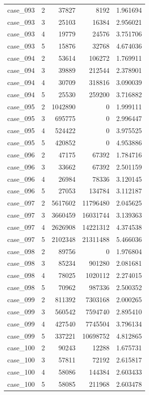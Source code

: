 \begin{longtable}{lrrrr}
case\_093 & 2 & 37827 & 8192 & 1.961694 \\
case\_093 & 3 & 25103 & 16384 & 2.956021 \\
case\_093 & 4 & 19779 & 24576 & 3.751706 \\
case\_093 & 5 & 15876 & 32768 & 4.674036 \\
case\_094 & 2 & 53614 & 106272 & 1.769911 \\
case\_094 & 3 & 39889 & 212544 & 2.378901 \\
case\_094 & 4 & 30709 & 318816 & 3.090039 \\
case\_094 & 5 & 25530 & 259200 & 3.716882 \\
case\_095 & 2 & 1042890 & 0 & 1.999111 \\
case\_095 & 3 & 695775 & 0 & 2.996447 \\
case\_095 & 4 & 524422 & 0 & 3.975525 \\
case\_095 & 5 & 420852 & 0 & 4.953886 \\
case\_096 & 2 & 47175 & 67392 & 1.784716 \\
case\_096 & 3 & 33662 & 67392 & 2.501159 \\
case\_096 & 4 & 26984 & 78336 & 3.120145 \\
case\_096 & 5 & 27053 & 134784 & 3.112187 \\
case\_097 & 2 & 5617602 & 11796480 & 2.045625 \\
case\_097 & 3 & 3660459 & 16031744 & 3.139363 \\
case\_097 & 4 & 2626908 & 14221312 & 4.374538 \\
case\_097 & 5 & 2102348 & 21311488 & 5.466036 \\
case\_098 & 2 & 89756 & 0 & 1.976804 \\
case\_098 & 3 & 85234 & 901280 & 2.081681 \\
case\_098 & 4 & 78025 & 1020112 & 2.274015 \\
case\_098 & 5 & 70962 & 987336 & 2.500352 \\
case\_099 & 2 & 811392 & 7303168 & 2.000265 \\
case\_099 & 3 & 560542 & 7594740 & 2.895410 \\
case\_099 & 4 & 427540 & 7745504 & 3.796134 \\
case\_099 & 5 & 337221 & 10698752 & 4.812865 \\
case\_100 & 2 & 90243 & 12288 & 1.675731 \\
case\_100 & 3 & 57811 & 72192 & 2.615817 \\
case\_100 & 4 & 58086 & 144384 & 2.603433 \\
case\_100 & 5 & 58085 & 211968 & 2.603478 \\
\end{longtable}
